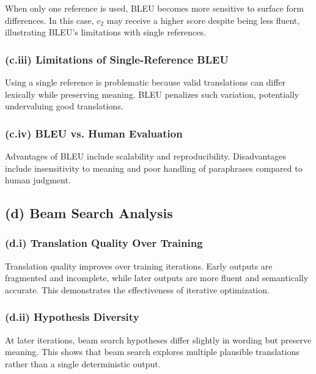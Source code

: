 \documentclass[11pt]{article}
\begin{document}
When only one reference is used, BLEU becomes more sensitive to surface form differences. In this case, $c_2$ may receive a higher score despite being less fluent, illustrating BLEU’s limitations with single references.

\subsubsection*{(c.iii) Limitations of Single-Reference BLEU}

Using a single reference is problematic because valid translations can differ lexically while preserving meaning. BLEU penalizes such variation, potentially undervaluing good translations.

\subsubsection*{(c.iv) BLEU vs. Human Evaluation}

Advantages of BLEU include scalability and reproducibility. Disadvantages include insensitivity to meaning and poor handling of paraphrases compared to human judgment.

\subsection*{(d) Beam Search Analysis}

\subsubsection*{(d.i) Translation Quality Over Training}

Translation quality improves over training iterations. Early outputs are fragmented and incomplete, while later outputs are more fluent and semantically accurate. This demonstrates the effectiveness of iterative optimization.

\subsubsection*{(d.ii) Hypothesis Diversity}

At later iterations, beam search hypotheses differ slightly in wording but preserve meaning. This shows that beam search explores multiple plausible translations rather than a single deterministic output.
\end{document}
